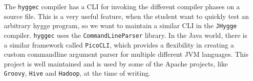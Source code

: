 The \texttt{hyggec} compiler has a CLI for invoking the different compiler phases on a source file. This is a very useful feature,
when the student want to quickly test an arbitrary hygge program, so we want to maintain a similar CLI in the \texttt{JHygge} compiler.
\texttt{hyggec} uses the \texttt{CommandLineParser} library. In the Java world, there is a similar framework called \texttt{PicoCLI},
which provides a flexibility in creating a custom commandline argument parser for multiple different JVM languages. This project
is well maintained and is used by some of the Apache projects, like \texttt{Groovy}, \texttt{Hive} and \texttt{Hadoop}, at the time of writing.
